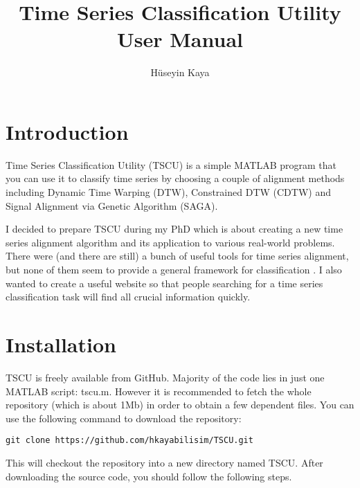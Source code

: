 \documentclass{article}
\title{Time Series Classification Utility\\ User Manual}
\author{H\"useyin Kaya}
\begin{document}
\maketitle
\tableofcontents

\section{Introduction}
Time Series Classification Utility (TSCU) is a simple MATLAB program that you can use it to classify time series by choosing a couple of alignment methods including Dynamic Time Warping (DTW), Constrained DTW (CDTW) and Signal Alignment via Genetic Algorithm (SAGA).

I decided to prepare TSCU during my PhD which is about creating a new time series alignment algorithm and its application to various real-world problems. There were (and there are still) a bunch of useful tools for time series alignment, but none of them seem to provide a general framework for classification \cite{UCRWeb}. I also wanted to create a useful website so that people searching for a time series classification task will find all crucial information quickly.
\section{Installation}
TSCU is freely available from GitHub. Majority of the code lies in just one MATLAB script: tscu.m. However it is recommended to fetch the whole repository (which is about 1Mb) in order to obtain a few dependent files. You can use the following command to download the repository:
\begin{verbatim}
git clone https://github.com/hkayabilisim/TSCU.git
\end{verbatim}
This will checkout the repository into a new directory named TSCU.
After downloading the source code, you should follow the following steps.
\end{document}

